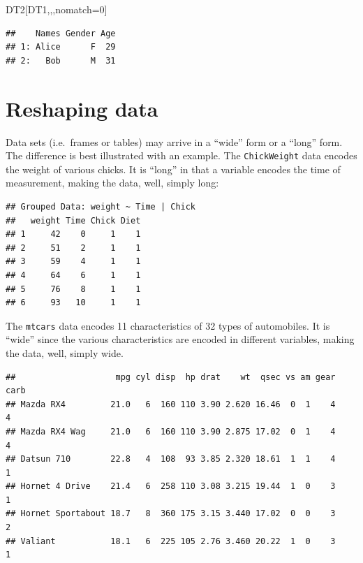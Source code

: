 \documentclass[]{book}
\newenvironment{Shaded}{\begin{snugshade}}{\end{snugshade}}
\newcommand{\DecValTok}[1]{\textcolor[rgb]{0.00,0.00,0.81}{#1}}
\newcommand{\StringTok}[1]{\textcolor[rgb]{0.31,0.60,0.02}{#1}}
\newcommand{\OperatorTok}[1]{\textcolor[rgb]{0.81,0.36,0.00}{\textbf{#1}}}
\newcommand{\NormalTok}[1]{#1}
\theoremstyle{definition}
\theoremstyle{definition}
\theoremstyle{definition}
\theoremstyle{remark}
\begin{document}
\begin{Shaded}
\begin{Highlighting}[]
\NormalTok{DT2[DT1,,,nomatch=}\DecValTok{0}\NormalTok{]}
\end{Highlighting}
\end{Shaded}

\begin{verbatim}
##    Names Gender Age
## 1: Alice      F  29
## 2:   Bob      M  31
\end{verbatim}

\section{Reshaping data}\label{reshaping-data}

Data sets (i.e.~frames or tables) may arrive in a ``wide'' form or a
``long'' form. The difference is best illustrated with an example. The
\texttt{ChickWeight} data encodes the weight of various chicks. It is
``long'' in that a variable encodes the time of measurement, making the
data, well, simply long:

\begin{Shaded}
\end{Shaded}

\begin{verbatim}
## Grouped Data: weight ~ Time | Chick
##   weight Time Chick Diet
## 1     42    0     1    1
## 2     51    2     1    1
## 3     59    4     1    1
## 4     64    6     1    1
## 5     76    8     1    1
## 6     93   10     1    1
\end{verbatim}

The \texttt{mtcars} data encodes 11 characteristics of 32 types of
automobiles. It is ``wide'' since the various characteristics are
encoded in different variables, making the data, well, simply wide.

\begin{Shaded}
\end{Shaded}

\begin{verbatim}
##                    mpg cyl disp  hp drat    wt  qsec vs am gear carb
## Mazda RX4         21.0   6  160 110 3.90 2.620 16.46  0  1    4    4
## Mazda RX4 Wag     21.0   6  160 110 3.90 2.875 17.02  0  1    4    4
## Datsun 710        22.8   4  108  93 3.85 2.320 18.61  1  1    4    1
## Hornet 4 Drive    21.4   6  258 110 3.08 3.215 19.44  1  0    3    1
## Hornet Sportabout 18.7   8  360 175 3.15 3.440 17.02  0  0    3    2
## Valiant           18.1   6  225 105 2.76 3.460 20.22  1  0    3    1
\end{verbatim}
\end{document}
